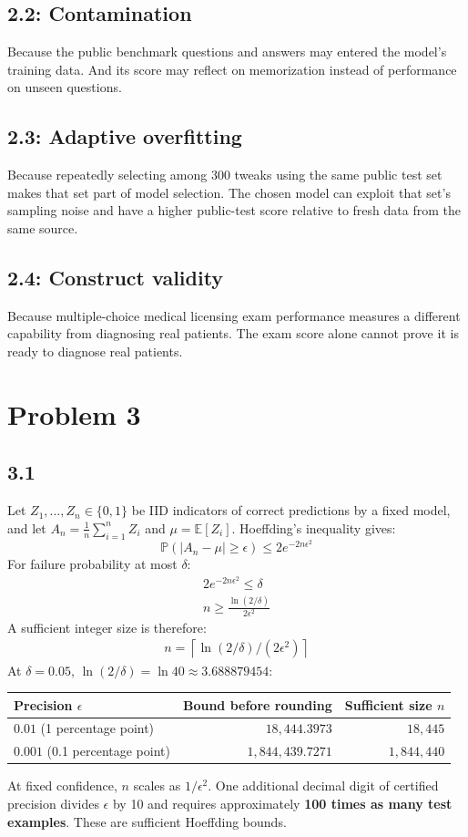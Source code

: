 \subsection*{2.2: Contamination}
Because the public benchmark questions and answers may entered the model's training data. And its score may reflect on memorization instead of performance on unseen questions.

\subsection*{2.3: Adaptive overfitting}
Because repeatedly selecting among 300 tweaks using the same public test set makes that set part of model selection. The chosen model can exploit that set's sampling noise and have a higher public-test score relative to fresh data from the same source.

\subsection*{2.4: Construct validity}
Because multiple-choice medical licensing exam performance measures a different capability from diagnosing real patients. The exam score alone cannot prove it is ready to diagnose real patients.

\newpage
\section*{Problem 3}

\subsection*{3.1}
Let $Z_1,\ldots,Z_n\in\{0,1\}$ be IID indicators of correct predictions by a fixed model, and let
$A_n=\frac1n\sum_{i=1}^{n}Z_i$ and $\mu=\mathbb{E}[Z_i]$. Hoeffding's inequality gives:
\[
\mathbb{P}(|A_n-\mu|\ge\epsilon)\le 2e^{-2n\epsilon^2}
\]
For failure probability at most $\delta$:
\begin{align*}
2e^{-2n\epsilon^2}\le\delta\\
n\ge\frac{\ln(2/\delta)}{2\epsilon^2}
\end{align*}
A sufficient integer size is therefore:
\begin{align*}
n=\left\lceil\ln(2/\delta)/(2\epsilon^2)\right\rceil
\end{align*}
At $\delta=0.05$, $\ln(2/\delta)=\ln40\approx3.688879454$:
\begin{center}
\begin{tabular}{@{}lrr@{}}
\toprule
Precision $\epsilon$ & Bound before rounding & Sufficient size $n$\\
\midrule
$0.01$ (1 percentage point) & $18{,}444.3973$ & $18{,}445$\\
$0.001$ (0.1 percentage point) & $1{,}844{,}439.7271$ & $1{,}844{,}440$\\
\bottomrule
\end{tabular}
\end{center}
At fixed confidence, $n$ scales as $1/\epsilon^2$. One additional decimal digit of certified precision divides $\epsilon$ by 10 and requires approximately \textbf{100 times as many test examples}. These are sufficient Hoeffding bounds.

